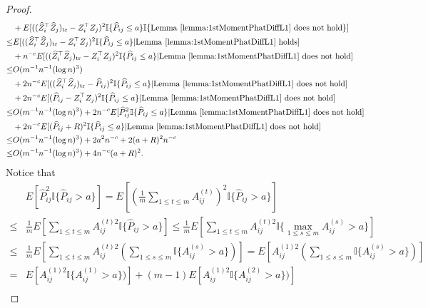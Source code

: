 \begin{proof}
\begin{align*}
	& + E[((\hat{Z}_i^{\top} \hat{Z}_j)_{\mathrm{tr}} - Z_i^{\top} Z_j)^2 \mathbb{I}\{\hat{P}_{ij} \le a\} \mathbb{I}\{\mathrm{Lemma\ } \ref{lemma:1stMomentPhatDiffL1} \mathrm{\ does\ not\ hold}\}] \\
	\le & E[((\hat{Z}_i^{\top} \hat{Z}_j)_{\mathrm{tr}} - Z_i^{\top} Z_j)^2 \mathbb{I}\{\hat{P}_{ij} \le a\} | \mathrm{Lemma\ } \ref{lemma:1stMomentPhatDiffL1} \mathrm{\ holds}] \\
	& + n^{-c} E[((\hat{Z}_i^{\top} \hat{Z}_j)_{\mathrm{tr}} - Z_i^{\top} Z_j)^2 \mathbb{I}\{\hat{P}_{ij} \le a\} | \mathrm{Lemma\ } \ref{lemma:1stMomentPhatDiffL1} \mathrm{\ does\ not\ hold}] \\
	\le & O(m^{-1} n^{-1} (\log n)^3) \\
	& + 2 n^{-c} E[((\hat{Z}_i^{\top} \hat{Z}_j)_{\mathrm{tr}} - \hat{P}_{ij})^2 \mathbb{I}\{\hat{P}_{ij} \le a\}| \mathrm{Lemma\ } \ref{lemma:1stMomentPhatDiffL1} \mathrm{\ does\ not\ hold}] \\
	& + 2 n^{-c} E[(\hat{P}_{ij} - Z_i^{\top} Z_j)^2 \mathbb{I}\{\hat{P}_{ij} \le a\}| \mathrm{Lemma\ } \ref{lemma:1stMomentPhatDiffL1} \mathrm{\ does\ not\ hold}] \\
	\le & O(m^{-1} n^{-1} (\log n)^3) + 2 n^{-c} E[\hat{P}_{ij}^2 \mathbb{I}\{\hat{P}_{ij} \le a\}| \mathrm{Lemma\ } \ref{lemma:1stMomentPhatDiffL1} \mathrm{\ does\ not\ hold}] \\
	& + 2 n^{-c} E[(\hat{P}_{ij} + R)^2 \mathbb{I}\{\hat{P}_{ij} \le a\}| \mathrm{Lemma\ } \ref{lemma:1stMomentPhatDiffL1} \mathrm{\ does\ not\ hold}] \\
	\le & O(m^{-1} n^{-1} (\log n)^3) + 2 a^2 n^{-c} + 2 (a+R)^2 n^{-c} \\
	\le & O(m^{-1} n^{-1} (\log n)^3) + 4 n^{-c} (a + R)^2.
\end{align*}
Notice that
\begin{align*}
	& E[\hat{P}_{ij}^2 \mathbb{I} \{ \hat{P}_{ij} > a \}]
	= E[(\frac{1}{m} \sum_{1 \le t \le m} A_{ij}^{(t)})^2 \mathbb{I} \{ \hat{P}_{ij} > a \}] \\
	\le & \frac{1}{m} E[\sum_{1 \le t \le m} A_{ij}^{(t)2} \mathbb{I} \{ \hat{P}_{ij} > a \}]
	\le \frac{1}{m} E[\sum_{1 \le t \le m} A_{ij}^{(t)2} \mathbb{I} \{ \max_{1 \le s \le m} A_{ij}^{(s)} > a \}] \\
	\le & \frac{1}{m} E[\sum_{1 \le t \le m} A_{ij}^{(t)2} (\sum_{1 \le s \le m}\mathbb{I} \{ A_{ij}^{(s)} > a \})]
	= E[A_{ij}^{(1)2} (\sum_{1 \le s \le m}\mathbb{I} \{ A_{ij}^{(s)} > a \})] \\
	= & E[A_{ij}^{(1)2} \mathbb{I} \{ A_{ij}^{(1)} > a \})] + (m-1) E[A_{ij}^{(1)2} \mathbb{I} \{ A_{ij}^{(2)} > a \})] \\

\end{align*}
\end{proof}
